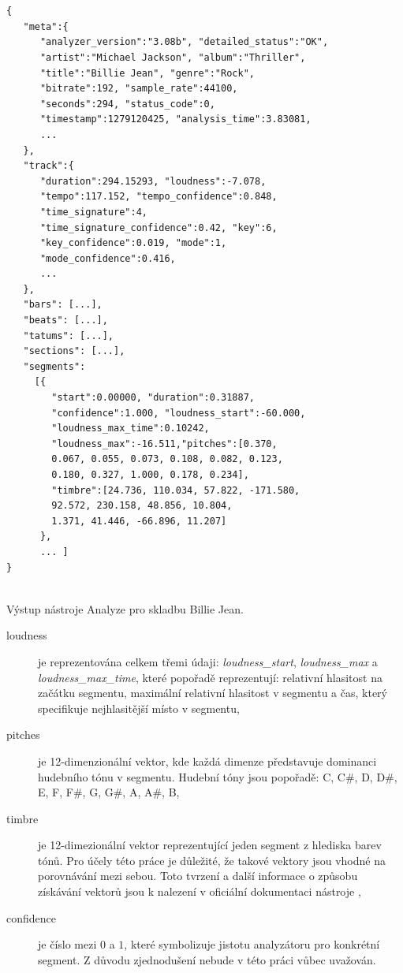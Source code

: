 \documentclass[thesis=M,czech]{FITthesis}[2012/06/26]
\begin{document}
\begin{listing}
\begin{verbatim}


{  
   "meta":{  
      "analyzer_version":"3.08b", "detailed_status":"OK",
      "artist":"Michael Jackson", "album":"Thriller",
      "title":"Billie Jean", "genre":"Rock",
      "bitrate":192, "sample_rate":44100,
      "seconds":294, "status_code":0,
      "timestamp":1279120425, "analysis_time":3.83081,
      ...
   },
   "track":{  
      "duration":294.15293, "loudness":-7.078,
      "tempo":117.152, "tempo_confidence":0.848,
      "time_signature":4,
      "time_signature_confidence":0.42, "key":6,
      "key_confidence":0.019, "mode":1,
      "mode_confidence":0.416,
      ...
   },
   "bars": [...],
   "beats": [...],
   "tatums": [...],
   "sections": [...],
   "segments":
     [{ 
        "start":0.00000, "duration":0.31887,
        "confidence":1.000, "loudness_start":-60.000,
        "loudness_max_time":0.10242,
        "loudness_max":-16.511,"pitches":[0.370,
        0.067, 0.055, 0.073, 0.108, 0.082, 0.123,
        0.180, 0.327, 1.000, 0.178, 0.234],
        "timbre":[24.736, 110.034, 57.822, -171.580,
        92.572, 230.158, 48.856, 10.804,
        1.371, 41.446, -66.896, 11.207]
      },
      ... ]
}


\end{verbatim}
\caption{Výstup nástroje Analyze pro skladbu Billie Jean.} 
\label{json-example}
\end{listing}

\begin{description}
\item[loudness]

je reprezentována celkem třemi údaji: \textit{loudness\_start}, \textit{loudness\_max} a \textit{loudness\_max\_time}, které popořadě reprezentují: relativní hlasitost na začátku segmentu, maximální relativní hlasitost v segmentu a čas, který specifikuje nejhlasitější místo v segmentu,
 
\item[pitches] je 12-dimenzionální vektor, kde každá dimenze představuje dominanci hudebního tónu v segmentu. Hudební tóny jsou popořadě: C, C\#, D, D\#, E, F, F\#, G, G\#, A, A\#, B,

\item[timbre] je 12-dimezionální vektor reprezentující jeden segment z hlediska barev tónů. Pro účely této práce je důležité, že takové vektory jsou vhodné na porovnávání mezi sebou. Toto tvrzení a další informace o způsobu získávání vektorů jsou k nalezení v oficiální dokumentaci nástroje \cite{analyze},

\item[confidence] je číslo mezi $0$ a $1$, které symbolizuje jistotu analyzátoru pro konkrétní segment. Z důvodu zjednodušení nebude v této práci vůbec uvažován.
\end{description}
\end{document}
